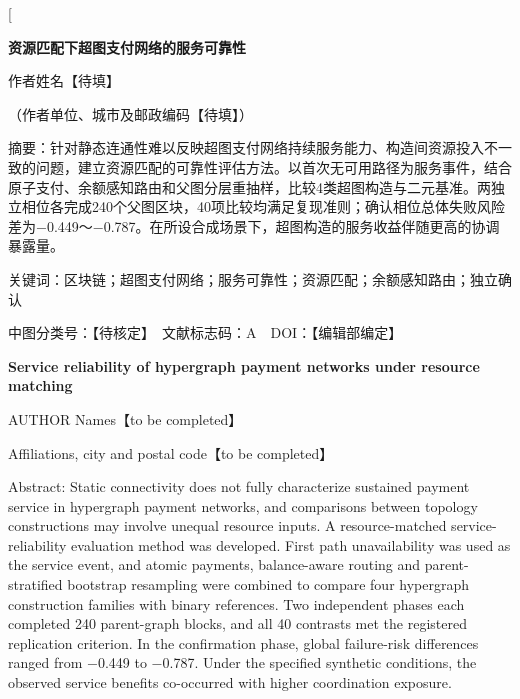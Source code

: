 \documentclass[UTF8,a4paper,twocolumn,fontset=none,zihao=5]{ctexart}
\begin{document}
\twocolumn[{\begin{minipage}{\textwidth}

\begin{center}\bfseries 资源匹配下超图支付网络的服务可靠性\end{center}

\begin{center}\small 作者姓名【待填】\end{center}

\begin{center}\small （作者单位、城市及邮政编码【待填】）\end{center}

{\small\noindent 摘要：针对静态连通性难以反映超图支付网络持续服务能力、构造间资源投入不一致的问题，建立资源匹配的可靠性评估方法。以首次无可用路径为服务事件，结合原子支付、余额感知路由和父图分层重抽样，比较4类超图构造与二元基准。两独立相位各完成240个父图区块，40项比较均满足复现准则；确认相位总体失败风险差为$-$0.449～$-$0.787。在所设合成场景下，超图构造的服务收益伴随更高的协调暴露量。\par}\vspace{3pt}

{\small\noindent 关键词：区块链；超图支付网络；服务可靠性；资源匹配；余额感知路由；独立确认\par}\vspace{3pt}

{\small\noindent 中图分类号：【待核定】　文献标志码：A　DOI：【编辑部编定】\par}\vspace{3pt}

\begin{center}\large\bfseries Service reliability of hypergraph payment networks under resource matching\end{center}

\begin{center}\small AUTHOR Names【to be completed】\end{center}

\begin{center}\small Affiliations, city and postal code【to be completed】\end{center}

{\small\noindent Abstract: Static connectivity does not fully characterize sustained payment service in hypergraph payment networks, and comparisons between topology constructions may involve unequal resource inputs. A resource-matched service-reliability evaluation method was developed. First path unavailability was used as the service event, and atomic payments, balance-aware routing and parent-stratified bootstrap resampling were combined to compare four hypergraph construction families with binary references. Two independent phases each completed 240 parent-graph blocks, and all 40 contrasts met the registered replication criterion. In the confirmation phase, global failure-risk differences ranged from $-$0.449 to $-$0.787. Under the specified synthetic conditions, the observed service benefits co-occurred with higher coordination exposure.\par}\vspace{3pt}


\end{minipage}}
\end{document}
